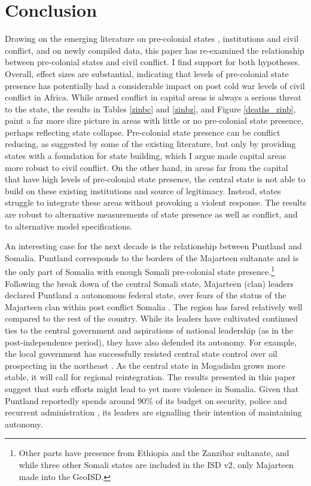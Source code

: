 \section{Conclusion} \label{Conclusion}

Drawing on the emerging literature on pre-colonial states \citep{Paine2019,
Depetris-Chauvin2016}, institutions \citep{Wig2016, Englebert2002,
Michalopoulos2018} and civil conflict, and on newly compiled data, this paper
has re-examined the relationship between pre-colonial states and civil conflict.
I find support for both hypotheses. Overall, effect sizes are substantial,
indicating that levels of pre-colonial state presence has potentially had a
considerable impact on post cold war levels of civil conflict in Africa. While
armed conflict in capital areas is always a serious threat to the state, the
results in Tables \ref{zinbc} and \ref{zinbz}, and Figure \ref{deaths_zinb},
paint a far more dire picture in areas with little or no pre-colonial state
presence, perhaps reflecting state collapse. Pre-colonial state presence can be
conflict reducing, as suggested by some of the existing literature, but only by
providing states with a foundation for state building, which I argue made
capital areas more robust to civil conflict. On the other hand, in areas far
from the capital that have high levels of pre-colonial state presence, the
central state is not able to build on these existing institutions and source of
legitimacy. Instead, states struggle to integrate these areas without provoking
a violent response. The results are robust to alternative measurements of state
presence as well as conflict, and to alternative model specifications.

An interesting case for the next decade is the relationship between Puntland and
Somalia. Puntland corresponds to the borders of the Majarteen sultanate and is
the only part of Somalia with enough Somali pre-colonial state
presence.\footnote{Other parts have presence from Ethiopia and the Zanzibar
sultanate, and while three other Somali states are included in the ISD v2, only
Majarteen made into the GeoISD.} Following the break down of the central
Somali state, Majarteen (clan) leaders declared Puntland a autonomous federal
state, over fears of the status of the Majarteen clan within post conflict
Somalia \citep{Johnson_2014}. The region has fared relatively well compared to the
rest of the country. While its leaders have cultivated continued ties to the
central government and aspirations of national leadership (as in the
post-independence period), they have also defended its autonomy. For example,
the local government has successfully resisted central state control over oil
prospecting in the northeast \citep{Johnson_2014}. As the central state in
Mogadishu grows more stable, it will call for regional reintegration. The
results presented in this paper suggest that such efforts might lead to yet more
violence in Somalia. Given that Puntland reportedly spends around 90\% of its
budget on security, police and recurrent administration \citep{Johnson_2014},
its leaders are signalling their intention of maintaining autonomy.

